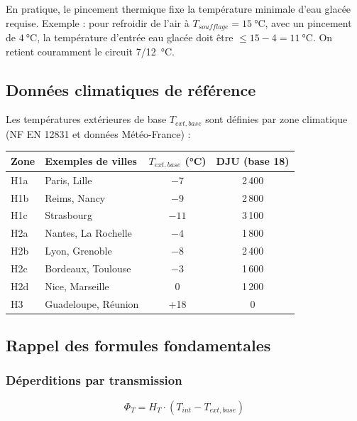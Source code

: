 \begin{attention}
  En pratique, le pincement thermique fixe la température minimale d'eau glacée requise.
  Exemple : pour refroidir de l'air à $T_{soufflage} = \SI{15}{\celsius}$, avec un
  pincement de $\SI{4}{\celsius}$, la température d'entrée eau glacée doit être
  $\leq 15 - 4 = \SI{11}{\celsius}$. On retient couramment le circuit \SI[parse-numbers=false]{7/12}{\celsius}.
\end{attention}

\subsection{Données climatiques de référence}

Les températures extérieures de base $T_{ext,base}$ sont définies par zone climatique (NF EN 12831 et données Météo-France) :

\begin{center}
\begin{tabular}{llcc}
  \toprule
  Zone & Exemples de villes & $T_{ext,base}$ (\si{\celsius}) & DJU (base 18) \\
  \midrule
  H1a & Paris, Lille         & $-7$  & 2\,400 \\
  H1b & Reims, Nancy         & $-9$  & 2\,800 \\
  H1c & Strasbourg           & $-11$ & 3\,100 \\
  H2a & Nantes, La Rochelle  & $-4$  & 1\,800 \\
  H2b & Lyon, Grenoble       & $-8$  & 2\,400 \\
  H2c & Bordeaux, Toulouse   & $-3$  & 1\,600 \\
  H2d & Nice, Marseille      & 0     & 1\,200 \\
  H3   & Guadeloupe, Réunion  & +18  & 0 \\
  \bottomrule
\end{tabular}
\end{center}

\subsection{Rappel des formules fondamentales}

\subsubsection{Déperditions par transmission}

\begin{equation}
  \Phi_{T} = H_T \cdot (T_{int} - T_{ext,base})
\end{equation}

